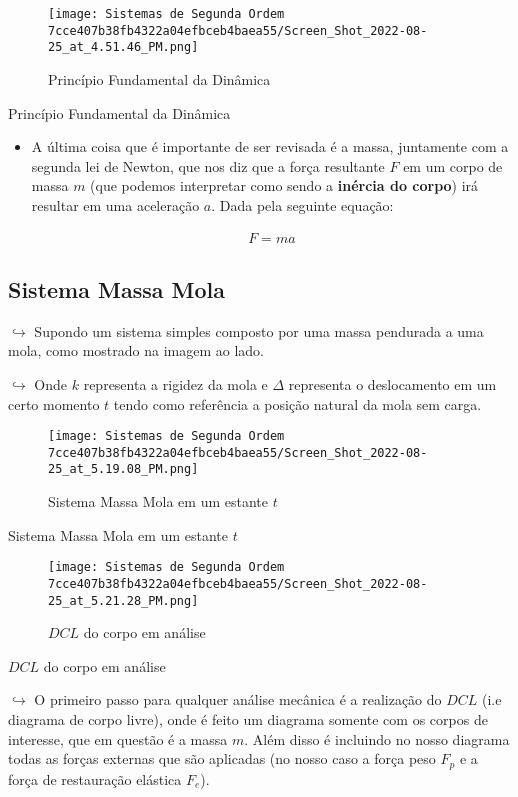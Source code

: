 \documentclass{article}
\begin{document}
\begin{itemize}
\begin{figure}
\centering
\texttt{[image: Sistemas de Segunda Ordem 7cce407b38fb4322a04efbceb4baea55/Screen\_Shot\_2022-08-25\_at\_4.51.46\_PM.png]}
\caption{Princípio Fundamental da Dinâmica}
\end{figure}

Princípio Fundamental da Dinâmica

\begin{itemize}
\item
  A última coisa que é importante de ser revisada é a massa, juntamente
  com a segunda lei de Newton, que nos diz que a força resultante \(F\)
  em um corpo de massa \(m\) (que podemos interpretar como sendo a
  \textbf{inércia do corpo}) irá resultar em uma aceleração \(a\). Dada
  pela seguinte equação:

  \[
    \begin{align}
    F = ma
    \end{align}
    \]
\end{itemize}

\hypertarget{sistema-massa-mola}{%
\subsection{Sistema Massa Mola}\label{sistema-massa-mola}}

\(\hookrightarrow\) Supondo um sistema simples composto por uma massa
pendurada a uma mola, como mostrado na imagem ao lado.

\(\hookrightarrow\) Onde \(k\) representa a rigidez da mola e \(\Delta\)
representa o deslocamento em um certo momento \(t\) tendo como
referência a posição natural da mola sem carga.

\begin{figure}
\centering
\texttt{[image: Sistemas de Segunda Ordem 7cce407b38fb4322a04efbceb4baea55/Screen\_Shot\_2022-08-25\_at\_5.19.08\_PM.png]}
\caption{Sistema Massa Mola em um estante \(t\)}
\end{figure}

Sistema Massa Mola em um estante \(t\)

\begin{figure}
\centering
\texttt{[image: Sistemas de Segunda Ordem 7cce407b38fb4322a04efbceb4baea55/Screen\_Shot\_2022-08-25\_at\_5.21.28\_PM.png]}
\caption{\(DCL\) do corpo em análise}
\end{figure}

\(DCL\) do corpo em análise

\(\hookrightarrow\) O primeiro passo para qualquer análise mecânica é a
realização do \(DCL\) (i.e diagrama de corpo livre), onde é feito um
diagrama somente com os corpos de interesse, que em questão é a massa
\(m\). Além disso é incluindo no nosso diagrama todas as forças externas
que são aplicadas (no nosso caso a força peso \(F_p\) e a força de
restauração elástica \(F_e\)).


\end{itemize}
\end{document}
